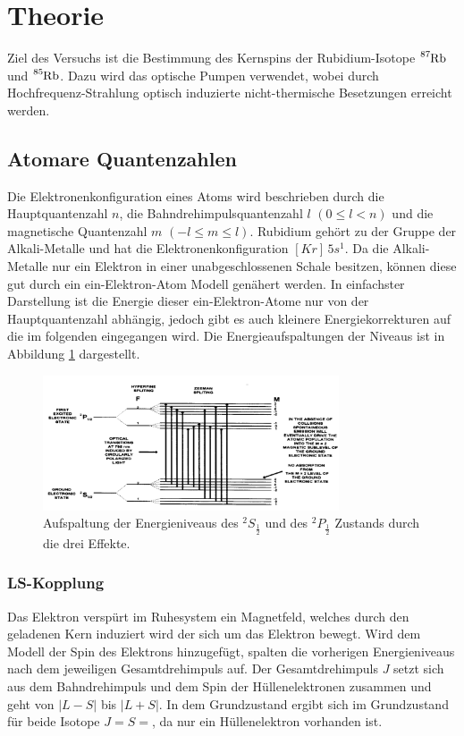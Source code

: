 \section{Theorie}
\label{sec:Theorie}
Ziel des Versuchs ist die Bestimmung des Kernspins der Rubidium-Isotope $\ce{^{87}Rb}$ und $\ce{^{85}Rb}$.
Dazu wird das optische Pumpen verwendet, wobei durch Hochfrequenz-Strahlung optisch induzierte nicht-thermische Besetzungen erreicht werden.

\subsection{Atomare Quantenzahlen}
Die Elektronenkonfiguration eines Atoms wird beschrieben durch die Hauptquantenzahl $n$, die Bahndrehimpulsquantenzahl $l$ $(0 \leq l < n)$ und die
magnetische Quantenzahl $m$ $(-l \leq m \leq l)$. 
Rubidium gehört zu der Gruppe der Alkali-Metalle und hat die
Elektronenkonfiguration $[Kr]\,5s^1$. 
Da die Alkali-Metalle nur ein Elektron in einer unabgeschlossenen Schale besitzen, können diese gut durch ein ein-Elektron-Atom Modell genähert werden.
In einfachster Darstellung ist die Energie dieser ein-Elektron-Atome nur von der Hauptquantenzahl abhängig, jedoch gibt es auch kleinere Energiekorrekturen
auf die im folgenden eingegangen wird. Die Energieaufspaltungen der Niveaus ist in Abbildung \ref{pic:en} dargestellt.
\begin{figure}
    \centering
    \includegraphics[width = 0.78\textwidth]{pics/energielevel.png}
    \caption{Aufspaltung der Energieniveaus des $^2S_{\frac{1}{2}}$ und des $^2P_{\frac{1}{2}}$ Zustands durch die drei Effekte.\cite{Optisches pumpen}}
    \label{pic:en}
\end{figure}

\subsubsection{LS-Kopplung}
Das Elektron verspürt im Ruhesystem ein Magnetfeld, welches durch den geladenen Kern induziert wird der sich um das Elektron bewegt.
Wird dem Modell der Spin des Elektrons hinzugefügt, spalten die vorherigen Energieniveaus nach dem jeweiligen Gesamtdrehimpuls auf.
Der Gesamtdrehimpuls $J$ setzt sich aus dem Bahndrehimpuls und dem Spin der Hüllenelektronen zusammen und geht von $|L - S|$ bis $|L + S|$.
In dem Grundzustand ergibt sich im Grundzustand für beide Isotope $J = S =$, da nur ein Hüllenelektron vorhanden ist.

